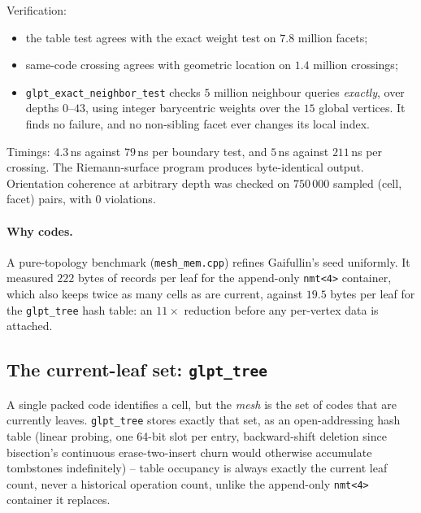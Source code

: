 \documentclass[11pt]{article}
\begin{document}
Verification:
\begin{itemize}
\item the table test agrees with the exact weight test on $7.8$ million
  facets;
\item same-code crossing agrees with geometric location on $1.4$ million
  crossings;
\item \texttt{glpt\_exact\_neighbor\_test} checks $5$ million neighbour
  queries \emph{exactly}, over depths $0$--$43$, using integer barycentric
  weights over the $15$ global vertices. It finds no failure, and no
  non-sibling facet ever changes its local index.
\end{itemize}
Timings: $4.3$\,ns against $79$\,ns per boundary test, and $5$\,ns
against $211$\,ns per crossing. The Riemann-surface program produces
byte-identical output. Orientation coherence at arbitrary depth was
checked on $750\,000$ sampled (cell, facet) pairs, with $0$ violations.

\paragraph{Why codes.}
A pure-topology benchmark (\texttt{mesh\_mem.cpp}) refines Gaifullin's
seed uniformly. It measured $222$ bytes of records per leaf for the
append-only \texttt{nmt<4>} container, which also keeps twice as many
cells as are current, against $19.5$ bytes per leaf for the
\texttt{glpt\_tree} hash table: an $11\times$ reduction before any
per-vertex data is attached.

\subsection{The current-leaf set: \texttt{glpt\_tree}}
\label{sec:tree}

A single packed code identifies a cell, but the \emph{mesh} is the set of
codes that are currently leaves. \texttt{glpt\_tree} stores exactly that
set, as an open-addressing hash table (linear probing, one 64-bit slot per
entry, backward-shift deletion since bisection's continuous
erase-two-insert churn would otherwise accumulate tombstones
indefinitely) -- table occupancy is always exactly the current leaf count,
never a historical operation count, unlike the append-only \texttt{nmt<4>}
container it replaces.
\end{document}
